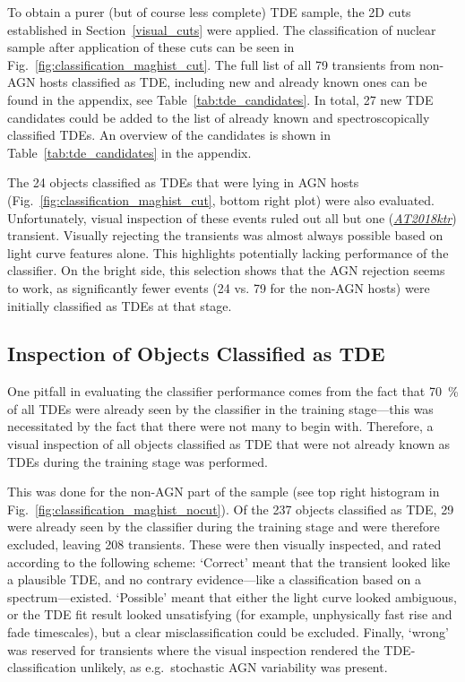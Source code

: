To obtain a purer (but of course less complete) TDE sample, the 2D cuts established in Section~\ref{visual_cuts} were applied. The classification of nuclear sample after application of these cuts can be seen in Fig.~\ref{fig:classification_maghist_cut}. The full list of all 79 transients from non-AGN hosts classified as TDE, including new and already known ones can be found in the appendix, see Table~\ref{tab:tde_candidates}. In total, 27 new TDE candidates could be added to the list of already known and spectroscopically classified TDEs. An overview of the candidates is shown in Table~\ref{tab:tde_candidates} in the appendix.

The 24 objects classified as TDEs that were lying in AGN hosts (Fig.~\ref{fig:classification_maghist_cut}, bottom right plot) were also evaluated. Unfortunately, visual inspection of these events ruled out all but one (\textit{\href{https://ztfnuclear.simeonreusch.com/transient/ZTF18acryjql}{AT2018ktr}}) transient. Visually rejecting the transients was almost always possible based on light curve features alone. This highlights potentially lacking performance of the classifier. On the bright side, this selection shows that the AGN rejection seems to work, as significantly fewer events (24 vs. 79 for the non-AGN hosts) were initially classified as TDEs at that stage.

\subsection{Inspection of Objects Classified as TDE}\label{all_tde_inspection}
One pitfall in evaluating the classifier performance comes from the fact that \SI{70}{\percent} of all TDEs were already seen by the classifier in the training stage---this was necessitated by the fact that there were not many to begin with. Therefore, a visual inspection of all objects classified as TDE that were not already known as TDEs during the training stage was performed.

This was done for the non-AGN part of the sample (see top right histogram in Fig.~\ref{fig:classification_maghist_nocut}). Of the 237 objects classified as TDE, 29 were already seen by the classifier during the training stage and were therefore excluded, leaving 208 transients. These were then visually inspected, and rated according to the following scheme: `Correct' meant that the transient looked like a plausible TDE, and no contrary evidence---like a classification based on a spectrum---existed. `Possible' meant that either the light curve looked ambiguous, or the TDE fit result looked unsatisfying (for example, unphysically fast rise and fade timescales), but a clear misclassification could be excluded. Finally, `wrong' was reserved for transients where the visual inspection rendered the TDE-classification unlikely, as e.g.~stochastic AGN variability was present.

